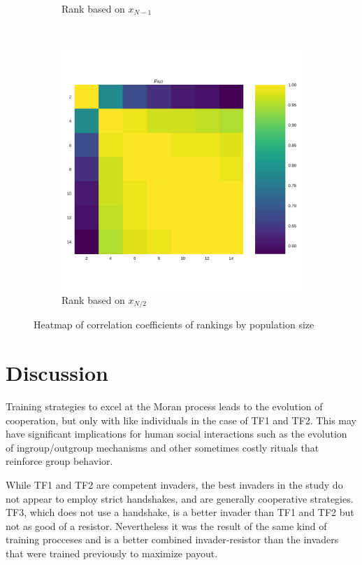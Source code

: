 \documentclass{article}
\begin{document}
\begin{figure}[!htbp]
\begin{subfigure}[t]{.3\textwidth}
        \caption{Rank based on \(x_{N - 1}\)}
    \end{subfigure}
    ~
    \begin{subfigure}[t]{.3\textwidth}
        \centering
        \includegraphics[width=.9\textwidth]{./img/correlation_heatmap_coexist.pdf}
        \caption{Rank based on \(x_{N/2}\)}
    \end{subfigure}
    \caption{Heatmap of correlation coefficients of rankings by population size}
    \label{fig:correlation_coefficients}
\end{figure}

\section{Discussion}

Training strategies to excel
at the Moran process leads to the evolution of cooperation, but only with like
individuals in the case of TF1 and TF2. This may have significant implications
for human social interactions such as the evolution of ingroup/outgroup mechanisms
and other sometimes costly rituals that reinforce group behavior.

While TF1 and TF2 are competent invaders, the best invaders
in the study do not appear to employ strict handshakes, and are generally
cooperative strategies. TF3, which does not use a handshake, is a better invader
than TF1 and TF2 but not as good of a resistor. Nevertheless it was the result
of the same kind of training procceses and is a better combined invader-resistor
than the invaders that were trained previously to maximize payout.
\end{document}
